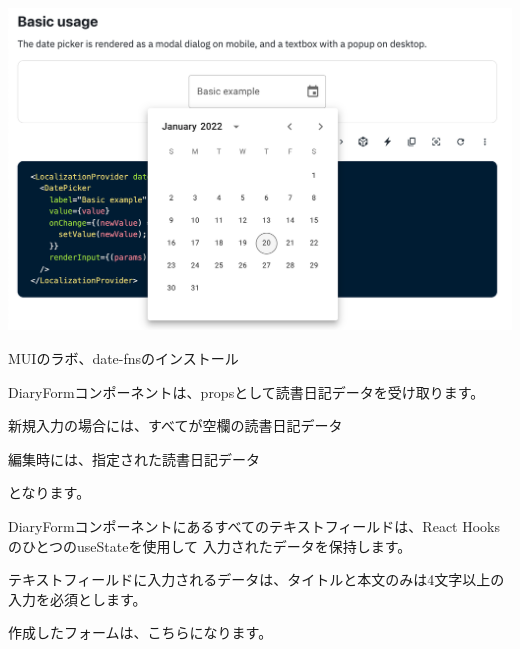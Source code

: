 \begin{reviewimage}%
\includegraphics[width=0.7\maxwidth]{./images/03-todo-with-react/mui017-muisite-datePicker.png}%
\label{image:03-todo-with-react:mui017-muisite-datePicker}
\end{reviewimage}
\def\startercodeblockfontsize{}
\begin{starterterminal}[]{MUIのラボ、date{-}fnsのインストール}\end{starterterminal}

DiaryFormコンポーネントは、propsとして読書日記データを受け取ります。

\begin{starteritemize}
\item 新規入力の場合には、すべてが空欄の読書日記データ
\item 編集時には、指定された読書日記データ
\end{starteritemize}

となります。

\vspace*{\baselineskip}

DiaryFormコンポーネントにあるすべてのテキストフィールドは、React HooksのひとつのuseStateを使用して
入力されたデータを保持します。

\vspace*{\baselineskip}

テキストフィールドに入力されるデータは、タイトルと本文のみは4文字以上の入力を必須とします。

作成したフォームは、こちらになります。

